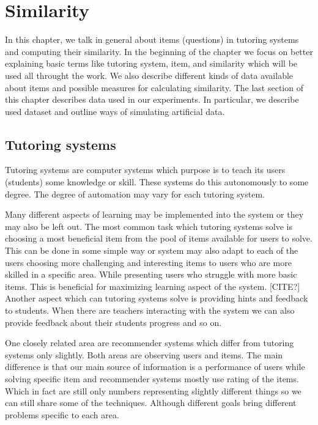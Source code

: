 \documentclass[
  digital, %
  table,   %
  nolof,     %
  nolot,     %
  nocover
]{fithesis3}
\begin{document}
\chapter{Similarity}




In this chapter, we talk in general about items (questions) in tutoring systems and computing their similarity. In the beginning of the chapter we focus on better explaining basic terms like tutoring system, item, and similarity which will be used all throught the work. We also describe different kinds of data available about items and possible measures for calculating similarity.
The last section of this chapter describes data used in our experiments. In particular, we describe used dataset and outline ways of simulating artificial data.

\section{Tutoring systems}\label{tutoring-systems}


Tutoring systems are computer systems which purpose is to teach its users (students) some knowledge or skill. These systems do this autonomously to some degree. The degree of automation may vary for each tutoring system.


Many different aspects of learning may be implemented into the system or they may also be left out. The most common task which tutoring systems solve is choosing a most beneficial item from the pool of items available for users to solve. This can be done in some simple way or system may also adapt to each of the users choosing more challenging and interesting items to users who are more skilled in a specific area. While presenting users who struggle with more basic items. This is beneficial for maximizing learning aspect of the system. [CITE?] Another aspect which can tutoring systems solve is providing hints and feedback to students. When there are teachers interacting with the system we can also provide feedback about their students progress and so on.


One closely related area are recommender systems which differ from tutoring systems only slightly. Both areas are observing users and items. The main difference is that our main source of information is a performance of users while solving specific item and recommender systems mostly use rating of the items. Which in fact are still only numbers representing slightly different things so we can still share some of the techniques. Although different goals bring different problems specific to each area.
\end{document}
